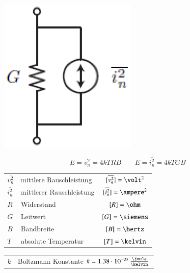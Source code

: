 \begin{minipage}[c]{0.21\columnwidth}
    \includegraphics[width=\columnwidth]{images/rauschquelle_strom.png}
\end{minipage}
\hfill
\begin{minipage}[c]{0.62\columnwidth}
    $$ \boxed{ E = \overline{v_n^2} = 4 k T R B } \qquad \boxed{ E = \overline{i_n^2} = 4 k T G B }$$

    \begin{tabular}{l l c}
        $\overline{v_n^2}$  & mittlere Rauschleistung   & $[\overline{v_n^2}] = \volt^2$ \\
        $\overline{i_n^2}$  & mittlerer Rauschleistung  & $[\overline{i_n^2}] = \ampere^2$ \\ 
        $R$                 & Widerstand                & $[R] = \ohm$ \\
        $G$                 & Leitwert                  & $[G] = \siemens$ \\
        $B$                 & Bandbreite                & $[B] = \hertz$ \\
        $T$                 & absolute Temperatur       & $[T] = \kelvin$
    \end{tabular}

    \begin{tabular}{ll}
        $k$                 & Boltzmann-Konstante $k = 1.38 \cdot 10^{-23} \, \frac{\joule}{\kelvin}$
    \end{tabular}
\end{minipage}


